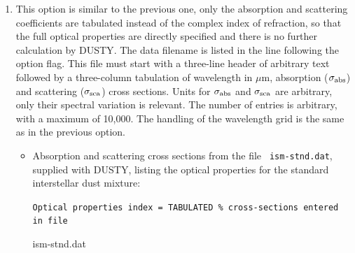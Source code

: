 \documentclass[11pt]{article}
\def\D  {{\sf DUSTY}}
\def\mic    {\hbox{$\mu$m}}
\begin{document}
\begin{enumerate}
\begin{itemize}
\item Draine \& Lee graphite grains with three additional grain types whose {\tt
n} and {\tt k} are provided by the user in data files {\tt amC-zb1.nk}, {\tt
amC-zb2.nk} and {\tt amC-zb3.nk}, distributed with DUSTY.  These files tabulate
the most recent properties for amorphous carbon by Zubko et al \cite{Zubko}:

\begin{verbatim}
   Optical properties index = COMMON_AND_ADDL_GRAIN
   Abundances of built-in grain types:
         Sil-Ow  Sil-Oc  Sil-DL  grf-DL amC-Hn SiC-Pg
     x =  0.00    0.00    0.00    0.22   0.00  0.00

   Number of additional components = 3, properties listed in files
                     amC-zb1.nk
                     amC-zb2.nk
                     amC-zb3.nk
   Abundances for these components = 0.45, 0.10, 0.23
\end{verbatim}
\end{itemize}

\item
This option is similar to the previous one, only the absorption and
scattering coefficients are tabulated instead of the complex index of
refraction, so that the full optical properties are directly specified and there
is no further calculation by \D.  The data filename is listed in the line
following the option flag.  This file must start with a three-line header of
arbitrary text followed by a three-column tabulation of wavelength in \mic,
absorption ($\sigma_{\rm abs}$) and scattering ($\sigma_{\rm sca}$) cross
sections. Units for $\sigma_{\rm abs}$ and $\sigma_{\rm sca}$ are arbitrary,
only
their spectral variation is relevant. The number of entries is arbitrary, with a
maximum of 10,000. The handling of the wavelength grid is the same as in the
previous option.

\begin{itemize}
\item
Absorption and scattering cross sections from the file {\tt
ism-stnd.dat}, supplied with \D, listing the optical properties for the
standard interstellar dust mixture:

{\tt Optical properties index = TABULATED \% cross-sections entered in file

\hskip 0.5in        ism-stnd.dat}
\end{itemize}

\end{enumerate}
\end{document}

